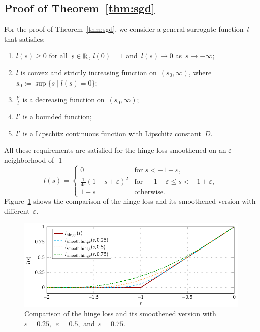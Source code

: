 \pagebreak

\subsection{Proof of Theorem~\ref{thm:sgd}}\label{app:sgd2}

For the proof of Theorem~\ref{thm:sgd}, we consider a general surrogate function~$l$ that satisfies:
\begin{enumerate}[label={(\textbf{S\arabic*})}, left = 15pt]
  \item \label{surr_basic1} $l(s)\geq 0$ for all~$s\in\mathbb{R}$, $l(0)=1$ and~$l(s)\to 0$ as~$s\to-\infty$;
  \item \label{surr_basic2} $l$ is convex and strictly increasing function on~$(s_0,\infty)$, where~$s_0:=\sup\{s \mid l(s)=0\}$;
  \item \label{surr_ratio} $\frac{l'}{l}$ is a decreasing function on~$(s_0,\infty)$;
  \item \label{surr_der1} $l'$ is a bounded function;
  \item \label{surr_der2} $l'$ is a Lipschitz continuous function with Lipschitz constant~$D$.
\end{enumerate}
All these requirements are satisfied for the hinge loss smoothened on an $\varepsilon$-neighborhood of -1
\begin{equation*}
  l(s) = \begin{cases}
    0 & \text{for } s < -1 - \varepsilon, \\
    \frac{1}{4\varepsilon}(1 + s + \varepsilon)^2 & \text{for } - 1 - \varepsilon \leq s < - 1 + \varepsilon, \\
    1 + s & \text{otherwise.}
  \end{cases}
\end{equation*}
Figure~\ref{fig: surrogates smooth} shows the comparison of the hinge loss and its smoothened version with different~$\varepsilon.$

\begin{figure}[t]
  \centering
  \includegraphics[width = \linewidth]{images/surrogates_smooth.pdf}
  \caption{Comparison of the hinge loss and its smoothened version with~$\varepsilon = 0.25,$~$\varepsilon = 0.5,$ and~$\varepsilon = 0.75.$}
  \label{fig: surrogates smooth}
\end{figure}

